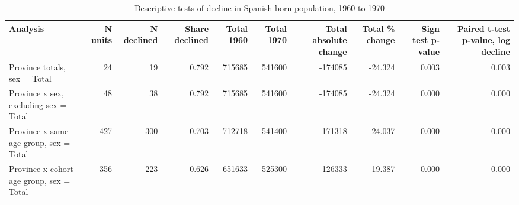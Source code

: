 \begin{table}

\caption{Descriptive tests of decline in Spanish-born population, 1960 to 1970}
\centering
\begin{tabular}[t]{lrrrrrrrrr}
\toprule
Analysis & N units & N declined & Share declined & Total 1960 & Total 1970 & Total absolute change & Total \% change & Sign test p-value & Paired t-test p-value, log decline\\
\midrule
Province totals, sex = Total & 24 & 19 & 0.792 & 715685 & 541600 & -174085 & -24.324 & 0.003 & 0.003\\
Province x sex, excluding sex = Total & 48 & 38 & 0.792 & 715685 & 541600 & -174085 & -24.324 & 0.000 & 0.000\\
Province x same age group, sex = Total & 427 & 300 & 0.703 & 712718 & 541400 & -171318 & -24.037 & 0.000 & 0.000\\
Province x cohort age group, sex = Total & 356 & 223 & 0.626 & 651633 & 525300 & -126333 & -19.387 & 0.000 & 0.000\\
\bottomrule
\end{tabular}
\end{table}
